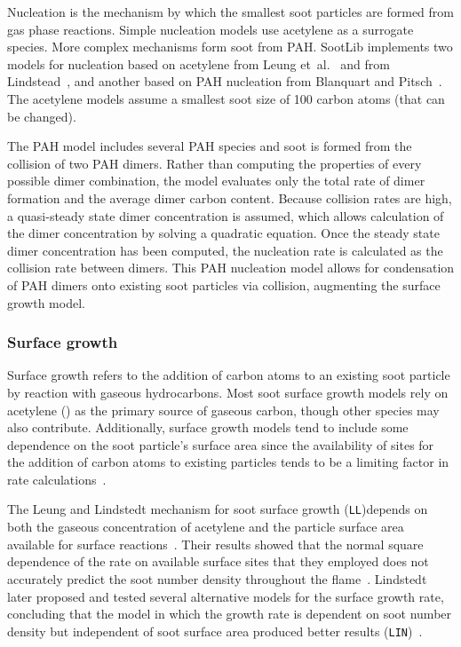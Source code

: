 \documentclass[preprint,letterpaper]{elsarticle}
\begin{document}
Nucleation is the mechanism by which the smallest soot particles are formed from gas phase reactions. Simple nucleation models use acetylene as a surrogate species. More complex mechanisms form soot from PAH. SootLib implements two models for nucleation based on acetylene from Leung et~al.~\cite{Leung_1991} and from Lindstead~\cite{Lindstedt_2005}, and another based on PAH nucleation from Blanquart and Pitsch~\cite{Blanquart_2009c}. The acetylene models assume a smallest soot size of 100 carbon atoms (that can be changed). 

The PAH model includes several PAH species and soot is formed from the collision of two PAH dimers. Rather than computing the properties of every possible dimer combination, the model evaluates only the total rate of dimer formation and the average dimer carbon content. Because collision rates are high, a quasi-steady state dimer concentration is assumed, which allows calculation of the dimer concentration by solving a quadratic equation. Once the steady state dimer concentration has been computed, the nucleation rate is calculated as the collision rate between dimers.
This PAH nucleation model allows for condensation of PAH dimers onto existing soot particles via collision, augmenting the surface growth model.

\subsubsection{Surface growth}
\label{s:grw}

Surface growth refers to the addition of carbon atoms to an existing soot particle by reaction with gaseous hydrocarbons. Most soot surface growth models rely on acetylene () as the primary source of gaseous carbon, though other species may also contribute. Additionally, surface growth models tend to include some dependence on the soot particle's surface area since the availability of sites for the addition of carbon atoms to existing particles tends to be a limiting factor in rate calculations~\cite{Wang_2011}.

The Leung and Lindstedt mechanism for soot surface growth (\texttt{LL})depends on both the gaseous concentration of acetylene and the particle surface area available for surface reactions~\cite{Leung_1991}. Their results showed that the normal square dependence of the rate on available surface sites that they employed does not accurately predict the soot number density throughout the flame~\cite{Leung_1991}. Lindstedt later proposed and tested several alternative models for the surface growth rate, concluding that the model in which the growth rate is dependent on soot number density but independent of soot surface area produced better results (\texttt{LIN})~\cite{Lindstedt_1994}.
\end{document}
